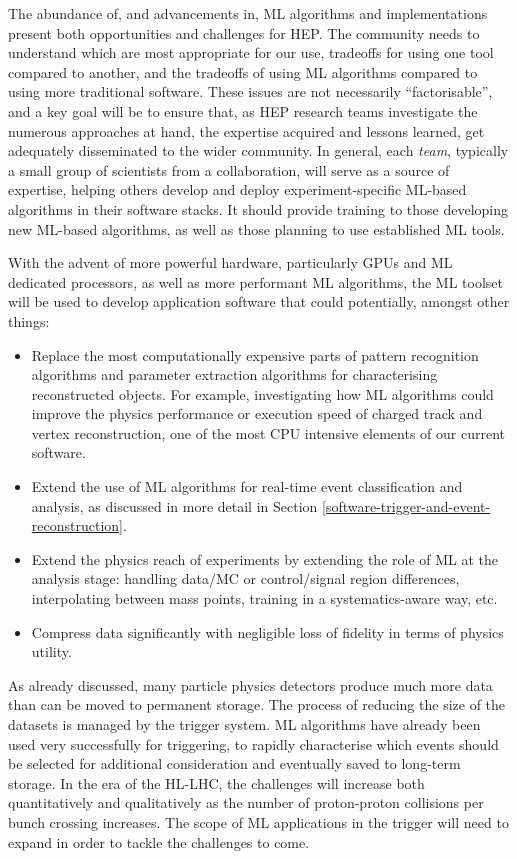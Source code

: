 The abundance of, and advancements in, ML algorithms and implementations
present both opportunities and challenges for HEP.
The community
needs to understand which are most appropriate for our use,
tradeoffs for using one tool compared to another, and
the tradeoffs of using ML algorithms compared to using more traditional software.
These issues are not necessarily ``factorisable'', and a key goal will
be to ensure that, as HEP research teams investigate the numerous
approaches at hand, the expertise acquired and lessons learned, get
adequately disseminated to the wider community. In general, each
\emph{team}, typically a small group of scientists from a collaboration,
will serve as a source of expertise, helping others develop and
deploy experiment-specific ML-based algorithms in their software stacks.
It should provide training to those developing new ML-based algorithms,
as well as those planning to use established ML tools.

With the advent of more powerful hardware, particularly GPUs and ML dedicated
processors, as well as more performant ML
algorithms, the ML toolset will be used to develop application software
that could potentially, amongst other things:

\begin{itemize}
\item
  Replace the most computationally expensive parts of pattern
  recognition algorithms and parameter extraction algorithms for
  characterising reconstructed objects. For example, investigating how
  ML algorithms could improve the physics performance or execution speed
  of charged track and vertex reconstruction, one of the most CPU
  intensive elements of our current software.
\item
  Extend the use of ML algorithms for real-time event classification and
  analysis, as discussed in more detail in Section \ref{software-trigger-and-event-reconstruction}.
\item
  Extend the physics reach of experiments by extending the role of ML at
  the analysis stage: handling data/MC or control/signal region
  differences, interpolating between mass points, training in a
  systematics-aware way, etc.
\item
  Compress data significantly with negligible loss of fidelity in terms
  of physics utility.
\end{itemize}

As already discussed, many particle physics detectors produce much more
data than can be moved to permanent storage. The process of reducing the
size of the datasets is managed by the trigger system. ML algorithms
have already been used very successfully for triggering, to rapidly
characterise which events should be selected for additional
consideration and eventually saved to long-term storage. In the era
of the HL-LHC, the challenges will increase both quantitatively and
qualitatively as the number of proton-proton collisions per bunch
crossing increases. The scope of ML applications in the trigger will
need to expand in order to tackle the challenges to come.

